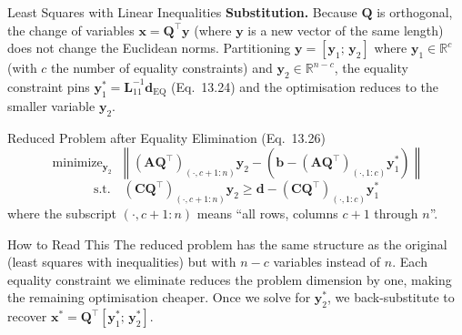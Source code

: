 \documentclass[aspectratio=169,10pt]{beamer}
\DeclareMathOperator*{\minimize}{minimize}
\newcommand{\bx}{\mathbf{x}}
\newcommand{\bb}{\mathbf{b}}
\newcommand{\bA}{\mathbf{A}}
\newcommand{\bC}{\mathbf{C}}
\newcommand{\bd}{\mathbf{d}}
\newcommand{\R}{\mathbb{R}}
\begin{document}
\begin{frame}[allowframebreaks]{Least Squares with Linear Inequalities}
  \textbf{Substitution.}  Because $\mathbf{Q}$ is orthogonal, the change of
  variables $\bx = \mathbf{Q}^{\top}\mathbf{y}$ (where $\mathbf{y}$ is a new
  vector of the same length) does not change the Euclidean norms.  Partitioning
  $\mathbf{y} = [\mathbf{y}_1;\, \mathbf{y}_2]$ where $\mathbf{y}_1 \in \R^c$
  (with $c$ the number of equality constraints) and
  $\mathbf{y}_2 \in \R^{n-c}$, the equality constraint pins
  $\mathbf{y}_1^* = \mathbf{L}_{11}^{-1}\bd_{\text{EQ}}$ (Eq.~13.24) and
  the optimisation reduces to the smaller variable $\mathbf{y}_2$.

  \begin{block}{Reduced Problem after Equality Elimination (Eq.~13.26)}
    \[
      \minimize_{\mathbf{y}_2}\;
      \left\|(\bA\mathbf{Q}^{\top})_{(\cdot,c+1:n)}\mathbf{y}_2
      - \left(\bb - (\bA\mathbf{Q}^{\top})_{(\cdot,1:c)}\mathbf{y}_1^*\right)\right\|
    \]
    \[
      \text{s.t.}\quad
      (\bC\mathbf{Q}^{\top})_{(\cdot,c+1:n)}\mathbf{y}_2
      \geq \bd - (\bC\mathbf{Q}^{\top})_{(\cdot,1:c)}\mathbf{y}_1^*
    \]
    where the subscript $(\cdot,c+1:n)$ means ``all rows, columns $c{+}1$ through $n$''.
  \end{block}

  \begin{alertblock}{How to Read This}
    The reduced problem has the same structure as the original (least squares with
    inequalities) but with $n - c$ variables instead of $n$.  Each equality
    constraint we eliminate reduces the problem dimension by one, making the
    remaining optimisation cheaper.  Once we solve for $\mathbf{y}_2^*$, we
    back-substitute to recover $\bx^* = \mathbf{Q}^{\top}[\mathbf{y}_1^*;\,\mathbf{y}_2^*]$.
  \end{alertblock}

\end{frame}
\end{document}

